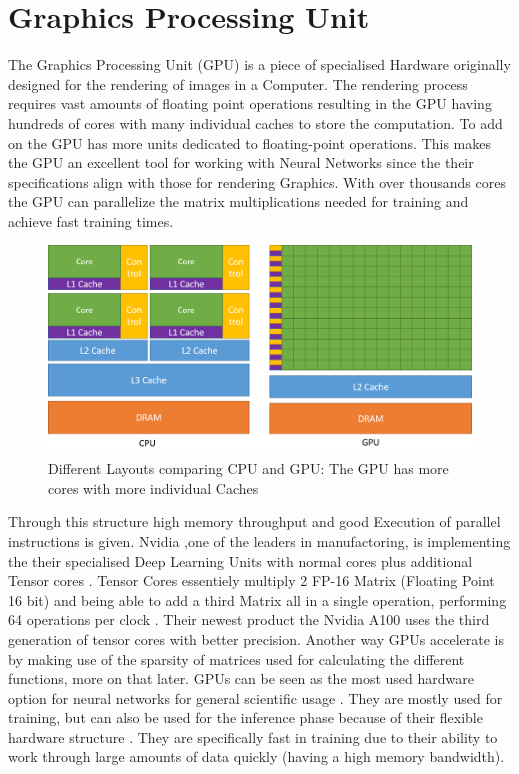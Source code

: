 \documentclass[conference]{IEEEtran}
\begin{document}
\section{Graphics Processing Unit}
The Graphics Processing Unit (GPU) is a piece of specialised Hardware originally designed for the rendering of images in a Computer. The rendering process requires vast amounts of floating point operations resulting in the GPU having hundreds of cores with many individual caches to store the computation. To add on the GPU has more units dedicated to floating-point operations. This makes the GPU an excellent tool for working with Neural Networks since the their specifications align with those for rendering Graphics. With over thousands cores the GPU can parallelize the matrix multiplications needed for training and achieve fast training times. 
\begin{figure}[h]
	\caption{Different Layouts comparing CPU and GPU: The GPU has more cores with more individual Caches \cite{intelpic_comparison}}
	\centering
	\includegraphics[width=\linewidth]{pictures/intel_comparison.png}
\end{figure}

Through this structure high memory throughput and good Execution of parallel instructions is given. Nvidia ,one of the leaders in manufactoring, is implementing the their specialised Deep Learning Units with normal cores plus additional Tensor cores \cite{nvidiav100}. Tensor Cores essentiely multiply 2 FP-16 Matrix (Floating Point 16 bit) and being able to add a third Matrix all in a single operation, performing 64 operations per clock \cite{tensorcores}. Their newest product the Nvidia A100 uses the third generation of tensor cores with better precision.
Another way GPUs accelerate is by making use of the sparsity of matrices used for calculating the different functions, more on that later.
GPUs can be seen as the most used hardware option for neural networks for general scientific usage \cite{mostusedgpu}. They are mostly used for training, but can also be used for the inference phase because of their flexible hardware structure \cite{capra2020updated}. They are specifically fast in training due to their ability to work through large amounts of data quickly (having a high memory bandwidth).
\end{document}
